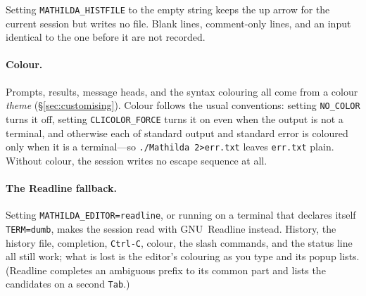 
\noindent
Setting \texttt{MATHILDA\_HISTFILE} to the empty string keeps the up arrow for the
current session but writes no file. Blank lines, comment-only lines, and an input
identical to the one before it are not recorded.

\paragraph{Colour.} Prompts, results, message heads, and the
syntax colouring all come from a colour \emph{theme} (\S\ref{sec:customising}).
Colour follows the usual conventions: setting \texttt{NO\_COLOR} turns it off,
setting \texttt{CLICOLOR\_FORCE} turns it on even when the output is not a terminal,
and otherwise each of standard output and standard error is coloured only when it
is a terminal---so \texttt{./Mathilda 2>err.txt} leaves \texttt{err.txt} plain.
Without colour, the session writes no escape sequence at all.

\paragraph{The Readline fallback.} Setting
\texttt{MATHILDA\_EDITOR=readline}, or running on a terminal that declares
itself \texttt{TERM=dumb}, makes the session read with GNU~Readline instead. History,
the history file, completion, \texttt{Ctrl-C}, colour, the slash commands, and the
status line all still work; what is lost is the editor's colouring as you type and
its popup lists. (Readline completes an ambiguous prefix to its common part and lists
the candidates on a second \texttt{Tab}.)%

